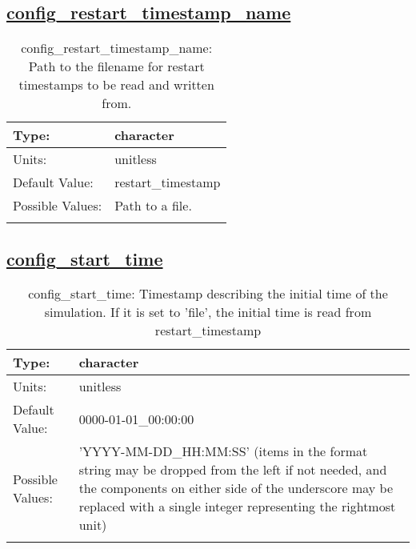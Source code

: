 \subsection[config\_restart\_timestamp\_name]{\hyperref[sec:nm_tab_time_management]{config\_restart\_timestamp\_name}}
\label{subsec:nm_sec_config_restart_timestamp_name}
\begin{center}
\begin{longtable}{| p{2.0in} || p{4.0in} |}
    \hline
    Type: & character \\
    \hline
    Units: & \si{unitless} \\
    \hline
    Default Value: & restart\_timestamp \\
    \hline
    Possible Values: & Path to a file. \\
    \hline
    \caption{config\_restart\_timestamp\_name: Path to the filename for restart timestamps to be read and written from.}
\end{longtable}
\end{center}
\subsection[config\_start\_time]{\hyperref[sec:nm_tab_time_management]{config\_start\_time}}
\label{subsec:nm_sec_config_start_time}
\begin{center}
\begin{longtable}{| p{2.0in} || p{4.0in} |}
    \hline
    Type: & character \\
    \hline
    Units: & \si{unitless} \\
    \hline
    Default Value: & 0000-01-01\_00:00:00 \\
    \hline
    Possible Values: & 'YYYY-MM-DD\_HH:MM:SS' (items in the format string may be dropped from the left if not needed, and the components on either side of the underscore may be replaced with a single integer representing the rightmost unit) \\
    \hline
    \caption{config\_start\_time: Timestamp describing the initial time of the simulation.  If it is set to 'file', the initial time is read from restart\_timestamp}
\end{longtable}
\end{center}
